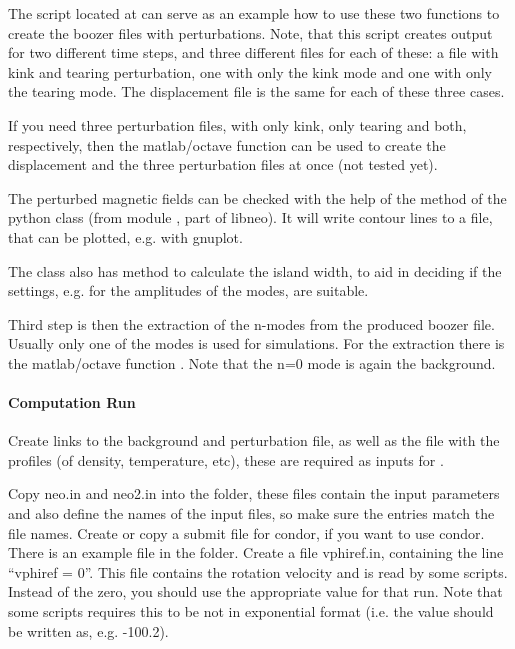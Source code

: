 The script 
located at 
can serve as an example how to use these two functions to create the
boozer files with perturbations. Note, that this script creates output
for two different time steps, and three different files for each of
these: a file with kink and tearing perturbation, one with only the kink
mode and one with only the tearing mode. The displacement file is the
same for each of these three cases.

If you need three perturbation files, with only kink, only tearing and
both, respectively, then the matlab/octave function
 can be used to create the
displacement and the three perturbation files at once (not tested yet).

The perturbed magnetic fields can be checked with the help of the
method  of the python class
 (from module , part of libneo). It
will write contour lines to a file, that can be plotted, e.g. with
gnuplot.

The class also has method  to
calculate the island width, to aid in
deciding if the settings, e.g. for the amplitudes of the modes, are
suitable.

Third step is then the extraction of the n-modes from the produced
boozer file. Usually only one of the modes is used for simulations.
For the extraction there is the matlab/octave function
.
Note that the n=0 mode is again the background.


\paragraph{Computation Run}
Create links to the background and perturbation file, as well as the
file with the profiles (of density, temperature, etc), these are required
as inputs for \neotwo.

Copy neo.in and neo2.in into the folder, these files contain the input
parameters and also define the names of the input files, so make sure
the entries match the file names. Create or copy a submit file
for condor, if you want to use condor. There is an example file in the
 folder. Create a file vphiref.in, containing the line
``vphiref = 0''. This file contains the rotation velocity and is read by
some scripts. Instead of the zero, you should use the appropriate value
for that run. Note that some scripts requires this
to be not in exponential format (i.e. the value should be written as,
e.g. -100.2).

